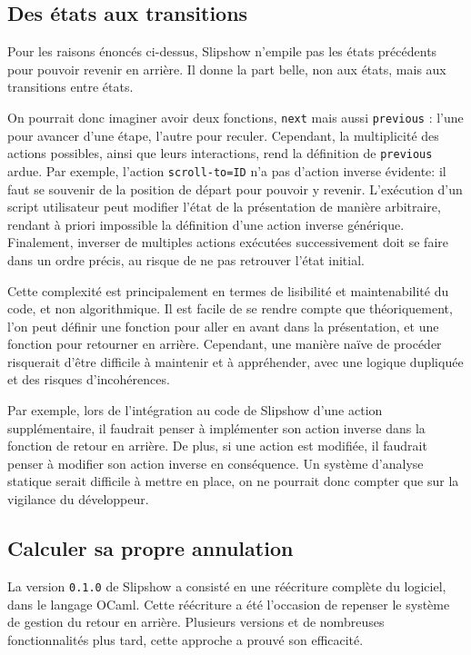 \documentclass[final]{jflart}
\begin{document}
\subsection{Des états aux transitions}

Pour les raisons énoncés ci-dessus, Slipshow n'empile pas les états précédents pour pouvoir revenir en arrière. Il donne la part belle, non aux états, mais aux transitions entre états.

On pourrait donc imaginer avoir deux fonctions, \texttt{next} mais aussi \texttt{previous} : l'une pour avancer d'une étape, l'autre pour reculer. Cependant, la multiplicité des actions possibles, ainsi que leurs interactions, rend la définition de \texttt{previous} ardue. Par exemple, l'action \texttt{scroll-to=ID} n'a pas d'action inverse évidente: il faut se souvenir de la position de départ pour pouvoir y revenir. L'exécution d'un script utilisateur peut modifier l'état de la présentation de manière arbitraire, rendant à priori impossible la définition d'une action inverse générique. Finalement, inverser de multiples actions exécutées successivement doit se faire dans un ordre précis, au risque de ne pas retrouver l'état initial.

Cette complexité est principalement en termes de lisibilité et maintenabilité du code, et non algorithmique. Il est facile de se rendre compte que théoriquement, l'on peut définir une fonction pour aller en avant dans la présentation, et une fonction pour retourner en arrière. Cependant, une manière naïve de procéder risquerait d'être difficile à maintenir et à appréhender, avec une logique dupliquée et des risques d'incohérences.

Par exemple, lors de l'intégration au code de Slipshow d'une action supplémentaire, il faudrait penser à implémenter son action inverse dans la fonction de retour en arrière. De plus, si une action est modifiée, il faudrait penser à modifier son action inverse en conséquence. Un système d'analyse statique serait difficile à mettre en place, on ne pourrait donc compter que sur la vigilance du développeur.

\subsection{Calculer sa propre annulation}

La version \texttt{0.1.0} de Slipshow a consisté en une réécriture complète du logiciel, dans le langage OCaml. Cette réécriture a été l'occasion de repenser le système de gestion du retour en arrière. Plusieurs versions et de nombreuses fonctionnalités plus tard, cette approche a prouvé son efficacité.
\end{document}

